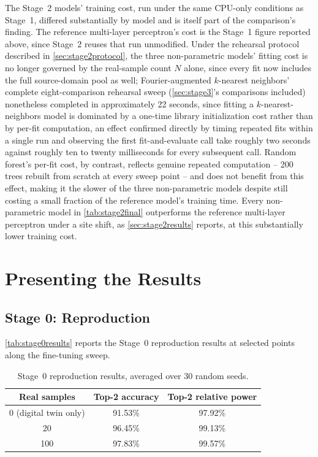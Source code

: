 \documentclass{iutbscthesis}
\begin{document}
The Stage~2 models' training cost, run under the same CPU-only conditions as Stage~1, differed substantially by model and is itself part of the comparison's finding. The reference multi-layer perceptron's cost is the Stage~1 figure reported above, since Stage~2 reuses that run unmodified. Under the rehearsal protocol described in \autoref{sec:stage2protocol}, the three non-parametric models' fitting cost is no longer governed by the real-sample count $N$ alone, since every fit now includes the full source-domain pool as well; Fourier-augmented $k$-nearest neighbors' complete eight-comparison rehearsal sweep (\autoref{sec:stage3}'s comparisons included) nonetheless completed in approximately 22 seconds, since fitting a $k$-nearest-neighbors model is dominated by a one-time library initialization cost rather than by per-fit computation, an effect confirmed directly by timing repeated fits within a single run and observing the first fit-and-evaluate call take roughly two seconds against roughly ten to twenty milliseconds for every subsequent call. Random forest's per-fit cost, by contrast, reflects genuine repeated computation -- 200 trees rebuilt from scratch at every sweep point -- and does not benefit from this effect, making it the slower of the three non-parametric models despite still costing a small fraction of the reference model's training time. Every non-parametric model in \autoref{tab:stage2final} outperforms the reference multi-layer perceptron under a site shift, as \autoref{sec:stage2results} reports, at this substantially lower training cost.

\section{Presenting the Results}
\label{sec:presentingresults}

\subsection{Stage 0: Reproduction}

\autoref{tab:stage0results} reports the Stage~0 reproduction results at selected points along the fine-tuning sweep.

\begin{table}[H]
    \centering
    \begin{tabular}{c c c}
        \toprule
        Real samples & Top-2 accuracy & Top-2 relative power \\
        \midrule
        0 (digital twin only) & 91.53\% & 97.92\% \\
        20 & 96.45\% & 99.13\% \\
        100 & 97.83\% & 99.57\% \\
        \bottomrule
    \end{tabular}
    \caption{Stage~0 reproduction results, averaged over 30 random seeds.}
    \label{tab:stage0results}
\end{table}
\end{document}
